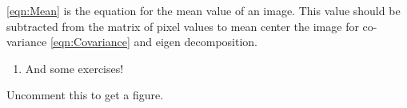 \documentclass{tufte-handout}
\begin{document}
\eqref{eqn:Mean} is the equation for the mean value of an image. This value should be subtracted from the matrix of pixel values to mean center the image for co-variance \eqref{eqn:Covariance} and eigen decomposition.




\begin{enumerate}[resume]
\item And some exercises!
\end{enumerate}




Uncomment this to get a figure.


\end{document}
